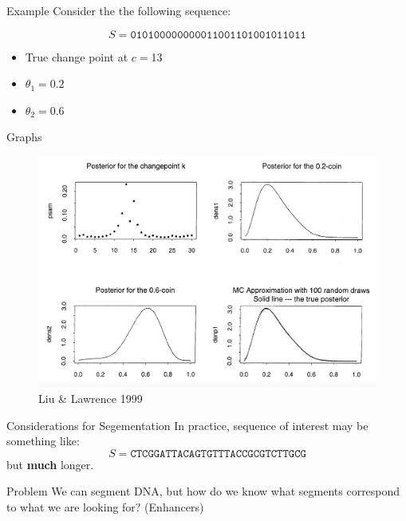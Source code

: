\documentclass{beamer}
\begin{document}
    \begin{frame}{Example}
    Consider the the following sequence:
    
    
    
         $$ S = \texttt{010100000000011001101001011011}$$
         
         \begin{itemize}
             \item True change point at $c=$13
             \item $\theta_1 = 0.2$
             \item $\theta_2 = 0.6$
         \end{itemize}
    \end{frame}
    \begin{frame}{Graphs}
            
        \begin{figure}
            \centering
            \includegraphics[scale=0.23]{LiuGraph.png}
            \caption{Liu \& Lawrence 1999}
            \label{fig:liuAndLawrence}
        \end{figure}
    \end{frame}
    
    \begin{frame}{Considerations for Segementation}
        In practice, sequence of interest may be something like:
            $$S = \texttt{CTCGGATTACAGTGTTTACCGCGTCTTGCG}$$
        but \textbf{much} longer. 
        
        \begin{block}{Problem}
        We can segment DNA, but how do we know what segments correspond to what we are looking for? (Enhancers)
        \end{block}
    \end{frame}
    
\end{document}
